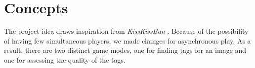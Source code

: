 \section{Concepts}
\label{gXLII:sec:concepts} %


The project idea draws inspiration from \textit{KissKissBan} \cite{10.1145/1600150.1600153}. 
Because of the possibility of having few simultaneous players, we made changes for asynchronous play. As a result, there are two distinct game modes, one for finding tags for an image and one for assessing the quality of the tags.

